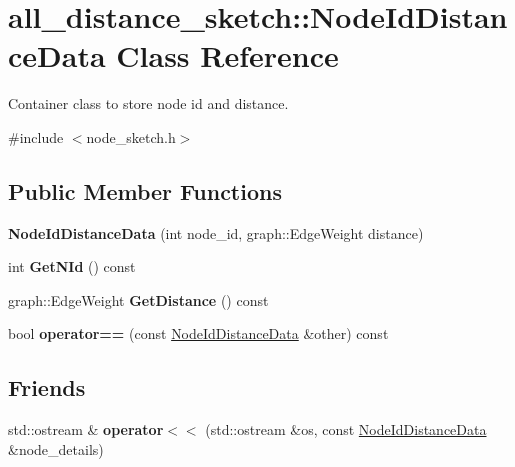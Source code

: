 \hypertarget{classall__distance__sketch_1_1NodeIdDistanceData}{}\section{all\+\_\+distance\+\_\+sketch\+:\+:Node\+Id\+Distance\+Data Class Reference}
\label{classall__distance__sketch_1_1NodeIdDistanceData}


Container class to store node id and distance.  




{\ttfamily \#include $<$node\+\_\+sketch.\+h$>$}

\subsection*{Public Member Functions}
\begin{DoxyCompactItemize}
\item 
\hypertarget{classall__distance__sketch_1_1NodeIdDistanceData_a7d1705f6029563192e5702c999d7fd66}{}{\bfseries Node\+Id\+Distance\+Data} (int node\+\_\+id, graph\+::\+Edge\+Weight distance)\label{classall__distance__sketch_1_1NodeIdDistanceData_a7d1705f6029563192e5702c999d7fd66}

\item 
\hypertarget{classall__distance__sketch_1_1NodeIdDistanceData_a2b31431054f9870f83fdcbc08f6ea90b}{}int {\bfseries Get\+N\+Id} () const \label{classall__distance__sketch_1_1NodeIdDistanceData_a2b31431054f9870f83fdcbc08f6ea90b}

\item 
\hypertarget{classall__distance__sketch_1_1NodeIdDistanceData_a779b0156893b012b774f4cbe86ca05c0}{}graph\+::\+Edge\+Weight {\bfseries Get\+Distance} () const \label{classall__distance__sketch_1_1NodeIdDistanceData_a779b0156893b012b774f4cbe86ca05c0}

\item 
\hypertarget{classall__distance__sketch_1_1NodeIdDistanceData_a85a76a9d00e5bd733cfe62532759e6bf}{}bool {\bfseries operator==} (const \hyperlink{classall__distance__sketch_1_1NodeIdDistanceData}{Node\+Id\+Distance\+Data} \&other) const \label{classall__distance__sketch_1_1NodeIdDistanceData_a85a76a9d00e5bd733cfe62532759e6bf}

\end{DoxyCompactItemize}
\subsection*{Friends}
\begin{DoxyCompactItemize}
\item 
\hypertarget{classall__distance__sketch_1_1NodeIdDistanceData_a3318b19f561aff9cd84f84f51434be37}{}std\+::ostream \& {\bfseries operator$<$$<$} (std\+::ostream \&os, const \hyperlink{classall__distance__sketch_1_1NodeIdDistanceData}{Node\+Id\+Distance\+Data} \&node\+\_\+details)\label{classall__distance__sketch_1_1NodeIdDistanceData_a3318b19f561aff9cd84f84f51434be37}

\end{DoxyCompactItemize}



